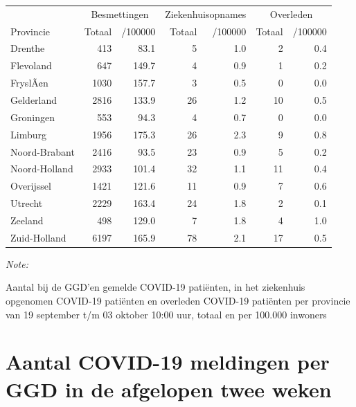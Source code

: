 \documentclass[
  english,
  man,floatsintext]{apa6}
\begin{document}
\begin{table}
\centering
\begin{threeparttable}
\begin{tabular}{lrrrrrr}
\toprule
\multicolumn{1}{c}{ } & \multicolumn{2}{c}{Besmettingen} & \multicolumn{2}{c}{Ziekenhuisopnames} & \multicolumn{2}{c}{Overleden} \\
\cmidrule(l{3pt}r{3pt}){2-3} \cmidrule(l{3pt}r{3pt}){4-5} \cmidrule(l{3pt}r{3pt}){6-7}
Provincie & Totaal & /100000 & Totaal & /100000 & Totaal & /100000\\
\midrule
Drenthe & 413 & 83.1 & 5 & 1.0 & 2 & 0.4\\
Flevoland & 647 & 149.7 & 4 & 0.9 & 1 & 0.2\\
FryslÃ¢n & 1030 & 157.7 & 3 & 0.5 & 0 & 0.0\\
Gelderland & 2816 & 133.9 & 26 & 1.2 & 10 & 0.5\\
Groningen & 553 & 94.3 & 4 & 0.7 & 0 & 0.0\\
Limburg & 1956 & 175.3 & 26 & 2.3 & 9 & 0.8\\
Noord-Brabant & 2416 & 93.5 & 23 & 0.9 & 5 & 0.2\\
Noord-Holland & 2933 & 101.4 & 32 & 1.1 & 11 & 0.4\\
Overijssel & 1421 & 121.6 & 11 & 0.9 & 7 & 0.6\\
Utrecht & 2229 & 163.4 & 24 & 1.8 & 2 & 0.1\\
Zeeland & 498 & 129.0 & 7 & 1.8 & 4 & 1.0\\
Zuid-Holland & 6197 & 165.9 & 78 & 2.1 & 17 & 0.5\\
\bottomrule
\end{tabular}
\begin{tablenotes}
\item \textit{Note: } 
\item Aantal bij de GGD’en gemelde COVID-19 patiënten, in het ziekenhuis opgenomen COVID-19 patiënten en overleden COVID-19 patiënten per provincie van 19 september t/m 03 oktober 10:00 uur, totaal en per 100.000 inwoners
\end{tablenotes}
\end{threeparttable}
\end{table}

\newpage

\hypertarget{aantal-covid-19-meldingen-per-ggd-in-de-afgelopen-twee-weken}{%
\section{Aantal COVID-19 meldingen per GGD in de afgelopen twee weken}\label{aantal-covid-19-meldingen-per-ggd-in-de-afgelopen-twee-weken}}
\end{document}
